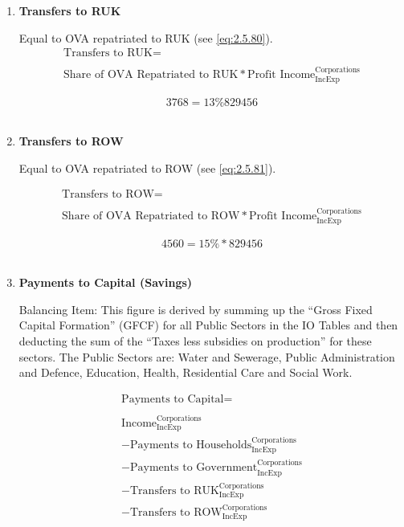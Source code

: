 \begin{enumerate}
\item \textbf {Transfers to RUK}

Equal to OVA repatriated to RUK (see \ref{eq:2.5.80}). \cite{ScotGov2012}\\

\begin{equation}
\begin{split}
\text{Transfers to RUK} =  \\ \\
\text{Share of OVA Repatriated to RUK}*\text{Profit Income}^\text{Corporations}_\text{IncExp}
\end{split} \label{eq:2.5.31}
\end{equation}

\begin{equation} \nonumber
3768 = 13\%829456
\end{equation}\\


\item \textbf {Transfers to ROW}

Equal to OVA repatriated to ROW (see \ref{eq:2.5.81}). \cite{ScotGov2012}

\begin{equation}
\begin{split}
\text{Transfers to ROW} =  \\ \\
\text{Share of OVA Repatriated to ROW}*\text{Profit Income}^\text{Corporations}_\text{IncExp}
\end{split} \label{eq:2.5.32}
\end{equation}

\begin{equation} \nonumber
4560 = 15\%*829456
\end{equation}\\


\item \textbf {Payments to Capital (Savings)}

Balancing Item: This figure is derived by summing up the “Gross Fixed Capital Formation” (GFCF) for all Public Sectors in the IO Tables and then deducting the sum of the “Taxes less subsidies on production” for these sectors. The Public Sectors are: Water and Sewerage, Public Administration and Defence, Education, Health, Residential Care and Social Work. \cite{ScotGov2013a}

\begin{equation}
\begin{split}
\text{Payments to Capital} =  \\ \\
\text{Income}^\text{Corporations}_\text{IncExp}\\
-\text{Payments to Households}^\text{Corporations}_\text{IncExp}\\
-\text{Payments to Government}^\text{Corporations}_\text{IncExp}\\
-\text{Transfers to RUK}^\text{Corporations}_\text{IncExp}\\
-\text{Transfers to ROW}^\text{Corporations}_\text{IncExp}
\end{split} \label{eq:2.5.33}
\end{equation}


\end{enumerate}
